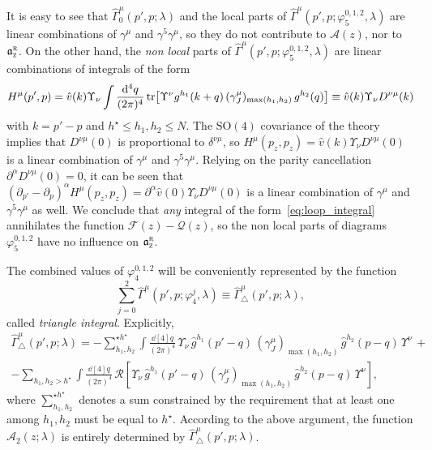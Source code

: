 \documentclass[a4paper, 11pt]{article}
\newcommand{\gyr}{\mathfrak{a}}								%
\newcommand{\rgyr}{\gyr_\textsc{z}^\textsc{r}}
\newcommand{\sing}[2]{{#1}^{#2}}							%
\renewcommand{\phi}{\varphi}								%
\newcommand{\ren}{\mathcal{R}}								%
\theoremstyle{thm}
\begin{document}
It is easy to see that $\hat{\Gamma}^\mu_0(p', p; \lambda)$ and the local parts of $\hat{\Gamma}^\mu(p', p; \phi_5^{0, 1, 2}, \lambda)$ are linear combinations of $\gamma^\mu$ and $\gamma^5 \gamma^\mu$, so they do not contribute to $\mathcal{A}(z)$, nor to $\rgyr$. On the other hand, the \emph{non local} parts of $\hat{\Gamma}^\mu(p', p; \phi_5^{0, 1, 2}, \lambda)$ are linear combinations of integrals of the form
\begin{equation}
\label{eq:loop_integral}
H^\mu(p', p) = \hat{v}(k) \Upsilon_\nu \int \frac{\dd[4]{q}}{(2\pi)^4} \tr[\Upsilon^\nu \sing{g}{h_1}(k + q) \, (\gamma^\mu_J)_{\max(h_1, h_2)} \, \sing{g}{h_2}(q)] \equiv \hat{v}(k) \Upsilon_\nu D^{\nu \mu}(k)
\end{equation}
with $k = p' - p$ and $h^\star \le h_1, h_2 \le N$. The $\mathrm{SO}(4)$ covariance of the theory implies that $D^{\nu \mu}(0)$ is proportional to $\delta^{\nu \mu}$, so  $H^\mu(p_z, p_z) = \hat{v}(k) \Upsilon_\nu D^{\nu \mu}(0)$ is a linear combination of $\gamma^\mu$ and $\gamma^5 \gamma^\mu$. Relying on the parity cancellation $\partial^\alpha D^{\nu \mu}(0) = 0$, it can be seen that $(\partial_{p'} - \partial_p)^\alpha H^\mu(p_z, p_z) = \partial^\alpha \hat{v}(0) \Upsilon_\nu D^{\nu \mu}(0)$ is a linear combination of $\gamma^\mu$ and $\gamma^5 \gamma^\mu$ as well. We conclude that \emph{any} integral of the form~\eqref{eq:loop_integral} annihilates the function $\mathcal{F}(z) - \mathcal{Q}(z)$, so the non local parts of diagrams $\phi_5^{0, 1, 2}$ have no influence on $\rgyr$.

The combined values of $\phi_4^{0, 1, 2}$ will be conveniently represented by the function
\begin{equation}
\sum_{j=0}^2 \hat{\Gamma}^\mu(p', p; \phi_4^j, \lambda) \equiv \hat{\Gamma}^\mu_\triangle(p', p; \lambda),
\end{equation}
called \emph{triangle integral}. Explicitly,
\begin{multline}
\label{eq:triangle_multiscale}
\hat{\Gamma}^\mu_\triangle(p', p; \lambda) = - \sum_{h_1, h_2}^{\star h^\star} \int \frac{\dd[4]{q}}{(2\pi)^4} \, \Upsilon_\nu \, \sing{\hat{g}}{h_1}(p' - q) \, (\gamma^\mu_J)_{\max(h_1, h_2)} \, \sing{\hat{g}}{h_2}(p - q) \, \Upsilon^\nu \, + \\
- \sum_{h_1, h_2 > h^\star} \int \frac{\dd[4]{q}}{(2\pi)^4} \, \ren[ \Upsilon_\nu \, \sing{\hat{g}}{h_1}(p' - q) \, (\gamma^\mu_J)_{\max(h_1, h_2)} \, \sing{\hat{g}}{h_2}(p - q) \, \Upsilon^\nu ],
\end{multline}
where $\sum_{h_1, h_2}^{\star h^\star}$ denotes a sum constrained by the requirement that at least one among $h_1, h_2$ must be equal to $h^\star$. According to the above argument, the function $\mathcal{A}_2(z; \lambda)$ is entirely determined by $\hat{\Gamma}^\mu_\triangle(p', p; \lambda)$.
\end{document}
